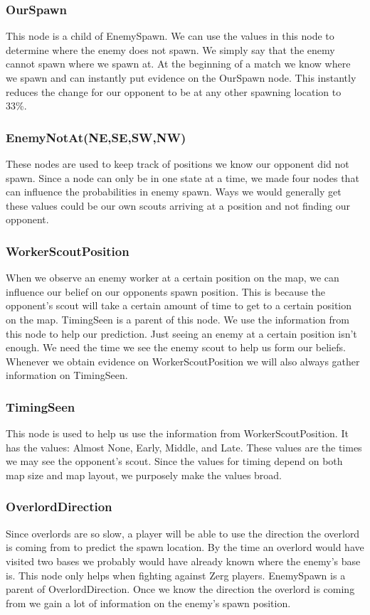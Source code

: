 \subsubsection*{OurSpawn}
This node is a child of EnemySpawn. We can use the values in this node to determine where the enemy does not spawn. We simply say that the enemy cannot spawn where we spawn at. At the beginning of a match we know where we spawn and can instantly put evidence on the OurSpawn node. This instantly reduces the change for our opponent to be at any other spawning location to 33\%.

\subsubsection*{EnemyNotAt(NE,SE,SW,NW)}
These nodes are used to keep track of positions we know our opponent did not spawn. Since a node can only be in one state at a time, we made four nodes that can influence the probabilities in enemy spawn. Ways we would generally get these values could be our own scouts arriving at a position and not finding our opponent.

\subsubsection*{WorkerScoutPosition} When we observe an enemy worker at a certain position on the map, we can influence our belief on our opponents spawn position. This is because the opponent's scout will take a certain amount of time to get to a certain position on the map. TimingSeen is a parent of this node. We use the information from this node to help our prediction. Just seeing an enemy at a certain position isn't enough. We need the time we see the enemy scout to help us form our beliefs. Whenever we obtain evidence on WorkerScoutPosition we will also always gather information on TimingSeen.

\subsubsection*{TimingSeen} This node is used to help us use the information from WorkerScoutPosition. It has the values: Almost None, Early, Middle, and Late. These values are the times we may see the opponent's scout. Since the values for timing depend on both map size and map layout, we purposely make the values broad.


\subsubsection*{OverlordDirection} Since overlords are so slow, a player will be able to use the direction the overlord is coming from to predict the spawn location. By the time an overlord would have visited two bases we probably would have already known where the enemy's base is. This node only helps when fighting against Zerg players. EnemySpawn is a parent of OverlordDirection. Once we know the direction the overlord is coming from we gain a lot of information on the enemy's spawn position.

